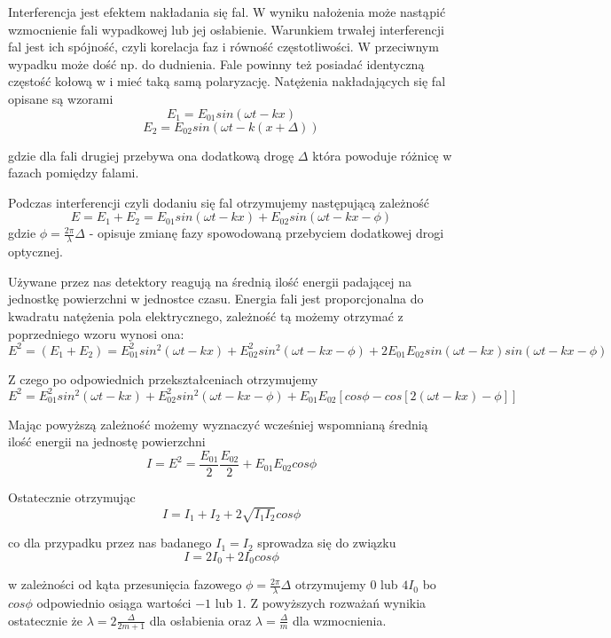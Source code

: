 \documentclass[a4paper]{article}
\newlength{\du}
\begin{document}
Interferencja jest efektem nakładania się fal. W wyniku nałożenia może nastąpić wzmocnienie fali wypadkowej lub jej osłabienie.  Warunkiem trwałej interferencji fal jest ich spójność, czyli korelacja faz i równość częstotliwości. W przeciwnym wypadku może dość np. do dudnienia. %
Fale powinny też posiadać identyczną częstość kołową w i mieć taką samą polaryzację.
Natężenia nakładających się fal opisane są wzorami
$$E_{1} = E_{01} sin( \omega t − kx )$$
$$E_{2} = E_{02} sin( \omega t − k ( x + \Delta ))$$

gdzie dla fali drugiej przebywa ona dodatkową drogę $\Delta$ która powoduje różnicę w fazach pomiędzy falami.

Podczas interferencji czyli dodaniu się fal otrzymujemy następującą zależność
$$E = E_{1} + E_{2} = E_{01} sin( \omega t − kx ) + E_{02} sin( \omega t − k x  − \phi )$$ gdzie $\phi =\frac{2\pi}{\lambda}\Delta$ - opisuje zmianę fazy spowodowaną przebyciem dodatkowej drogi optycznej.

Używane przez nas detektory reagują na średnią ilość energii padającej na jednostkę powierzchni w jednostce czasu. Energia fali jest proporcjonalna do kwadratu natężenia pola elektrycznego, zależność tą możemy otrzymać z poprzedniego wzoru wynosi ona:
$$E^2 = ( E_{1} + E_{2} ) = E_{01}^2 sin^2 ( \omega t − kx ) + E_{02}^2 sin^2 ( \omega t − kx − \phi ) + 2 E_{01} E_{02} sin( \omega t − kx ) sin( \omega t − kx − \phi )$$

Z czego po odpowiednich przekształceniach otrzymujemy 
$$E^2 = E_{01}^2 sin^2 (\omega t − kx ) + E_{02}^2 sin^2 ( \omega t − kx − \phi ) + E_{01} E_{02} [cos \phi − cos[ 2 ( \omega t − kx ) − \phi ]]$$

Mając powyższą zależność możemy wyznaczyć wcześniej wspomnianą średnią ilość energii na jednostę powierzchni
$$I = E^2 =\frac{E_{01}}{2} \frac{E_{02}}{2} + E_{01}E_{02} cos \phi$$

Ostatecznie otrzymując 
$$I = I_{1} + I_{2} + 2 \sqrt{I_{1} I_{2}} cos \phi$$

co dla przypadku przez nas badanego $I_{1} = I_{2}$ sprowadza się do związku
$$I = 2I_{0} + 2 I_{0} cos \phi$$

w zależności od kąta przesunięcia fazowego $\phi =\frac{2\pi}{\lambda}\Delta$ otrzymujemy $0$ lub $4 I_{0}$ bo $cos \phi$ odpowiednio osiąga wartości $-1$ lub $1$. Z powyższych rozważań wynikia ostatecznie że 
$\lambda = 2 \frac{\Delta}{2m+1} $ dla osłabienia oraz $\lambda = \frac{\Delta}{m}$ dla wzmocnienia.
\end{document}
